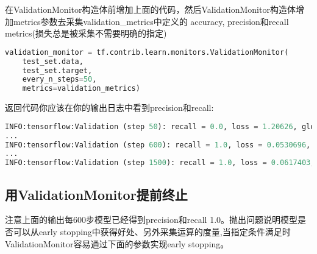 在ValidationMonitor构造体前增加上面的代码，然后ValidationMonitor构造体增加metrics参数去采集validation\_metrics中定义的 accuracy, precision和recall metrics(损失总是被采集不需要明确的指定)
\begin{lstlisting}[language=Python]
validation_monitor = tf.contrib.learn.monitors.ValidationMonitor(
    test_set.data,
    test_set.target,
    every_n_steps=50,
    metrics=validation_metrics)
\end{lstlisting}
返回代码你应该在你的输出日志中看到precision和recall:
\begin{lstlisting}[language=Python]
INFO:tensorflow:Validation (step 50): recall = 0.0, loss = 1.20626, global_step = 1, precision = 0.0, accuracy = 0.266667
...
INFO:tensorflow:Validation (step 600): recall = 1.0, loss = 0.0530696, global_step = 571, precision = 1.0, accuracy = 0.966667
...
INFO:tensorflow:Validation (step 1500): recall = 1.0, loss = 0.0617403, global_step = 1452, precision = 1.0, accuracy = 0.966667
\end{lstlisting}
\subsection{用ValidationMonitor提前终止}
注意上面的输出每600步模型已经得到precision和recall 1.0。抛出问题说明模型是否可以从early stopping中获得好处、另外采集运算的度量,当指定条件满足时ValidationMonitor容易通过下面的参数实现early stopping。

